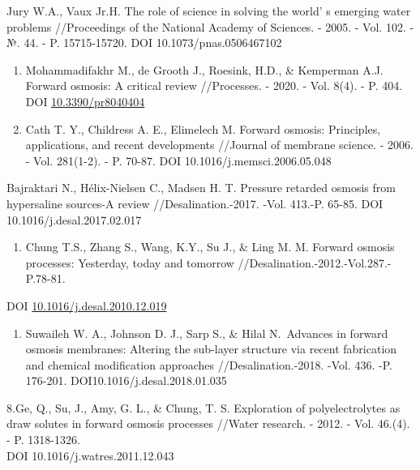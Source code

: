 Jury W.A., Vaux Jr.H. The role of science in solving the
world' s emerging water problems //Proceedings of the
National Academy of Sciences. - 2005. - Vol. 102. - №. 44. - P.
15715-15720. DOI 10.1073/pnas.0506467102

\begin{enumerate}
\def\labelenumi{\arabic{enumi}.}
\setcounter{enumi}{3}
\item
  Mohammadifakhr M., de Grooth J., Roesink, H.D., \& Kemperman A.J.
  Forward osmosis: A critical review //Processes. - 2020. - Vol. 8(4). -
  P. 404. DOI
  \href{http://dx.doi.org/10.3390/pr8040404}{10.3390/pr8040404}
\item
  Cath T. Y., Childress A. E., Elimelech M. Forward osmosis: Principles,
  applications, and recent developments //Journal of membrane science. -
  2006. - Vol. 281(1-2). - P. 70-87. DOI 10.1016/j.memsci.2006.05.048
\end{enumerate}

Bajraktari N., Hélix-Nielsen C., Madsen H. T. Pressure retarded osmosis
from hypersaline sources-A review //Desalination.-2017. -Vol. 413.-P.
65-85. DOI 10.1016/j.desal.2017.02.017

\begin{enumerate}
\def\labelenumi{\arabic{enumi}.}
\setcounter{enumi}{5}
\item
  Chung T.S., Zhang S., Wang, K.Y., Su J., \& Ling M. M. Forward osmosis
  processes: Yesterday, today and tomorrow
  //Desalination.-2012.-Vol.287.- P.78-81.
\end{enumerate}

DOI
\href{http://dx.doi.org/10.1016/j.desal.2010.12.019}{10.1016/j.desal.2010.12.019}

\begin{enumerate}
\def\labelenumi{\arabic{enumi}.}
\setcounter{enumi}{6}
\item
  Suwaileh W. A., Johnson D. J., Sarp S., \& Hilal N.~Advances in
  forward osmosis membranes: Altering the sub-layer structure via recent
  fabrication and chemical modification approaches //Desalination.-2018.
  -Vol. 436. -P. 176-201. DOI10.1016/j.desal.2018.01.035
\end{enumerate}

8.Ge, Q., Su, J., Amy, G. L., \& Chung, T. S. Exploration of
polyelectrolytes as draw solutes in forward osmosis processes //Water
research. - 2012. - Vol. 46.(4). - P. 1318-1326.\\
DOI 10.1016/j.watres.2011.12.043

